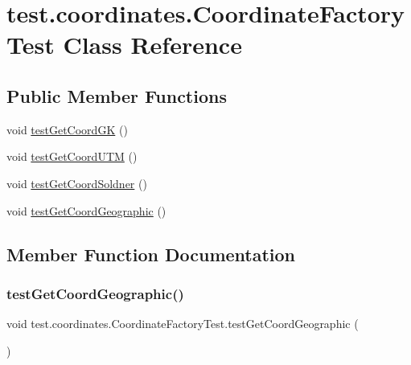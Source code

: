 \hypertarget{classtest_1_1coordinates_1_1_coordinate_factory_test}{}\section{test.\+coordinates.\+Coordinate\+Factory\+Test Class Reference}
\label{classtest_1_1coordinates_1_1_coordinate_factory_test}
\subsection*{Public Member Functions}
\begin{DoxyCompactItemize}
\item 
void \hyperlink{classtest_1_1coordinates_1_1_coordinate_factory_test_a81785f2e27095044bf840af1bd7c4318}{test\+Get\+Coord\+GK} ()
\item 
void \hyperlink{classtest_1_1coordinates_1_1_coordinate_factory_test_acf98b157e3fd1cc08ba0c606a1dc0cb6}{test\+Get\+Coord\+U\+TM} ()
\item 
void \hyperlink{classtest_1_1coordinates_1_1_coordinate_factory_test_ae193c135bac34e54987262ea1811e9ae}{test\+Get\+Coord\+Soldner} ()
\item 
void \hyperlink{classtest_1_1coordinates_1_1_coordinate_factory_test_abf343cdc1f007982306646bb8a4096fb}{test\+Get\+Coord\+Geographic} ()
\end{DoxyCompactItemize}


\subsection{Member Function Documentation}
\mbox{\label{classtest_1_1coordinates_1_1_coordinate_factory_test_abf343cdc1f007982306646bb8a4096fb}} 
\subsubsection{\texorpdfstring{test\+Get\+Coord\+Geographic()}{testGetCoordGeographic()}}
{\footnotesize\ttfamily void test.\+coordinates.\+Coordinate\+Factory\+Test.\+test\+Get\+Coord\+Geographic (\begin{DoxyParamCaption}{ }\end{DoxyParamCaption})}

